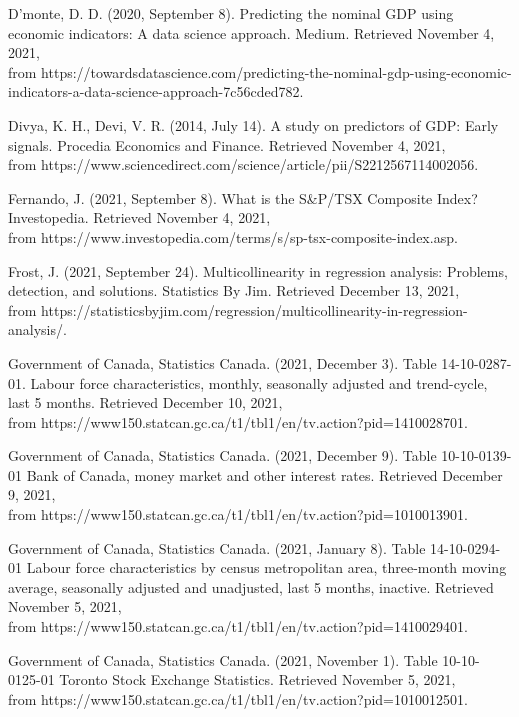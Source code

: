\documentclass{article}
\begin{document}
D’monte, D. D. (2020, September 8). Predicting the nominal GDP using economic indicators: A data science approach. Medium. Retrieved November 4, 2021,\\ from https://towardsdatascience.com/predicting-the-nominal-gdp-using-economic-indicators-a-data-science-approach-7c56cded782. 

Divya, K. H., Devi, V. R. (2014, July 14). A study on predictors of GDP: Early signals. Procedia Economics and Finance. Retrieved November 4, 2021,\\ from https://www.sciencedirect.com/science/article/pii/S2212567114002056. 

Fernando, J. (2021, September 8). What is the S&P/TSX Composite Index? Investopedia. Retrieved November 4, 2021,\\ from https://www.investopedia.com/terms/s/sp-tsx-composite-index.asp. 

Frost, J. (2021, September 24). Multicollinearity in regression analysis: Problems, detection, and solutions. Statistics By Jim. Retrieved December 13, 2021,\\ from https://statisticsbyjim.com/regression/multicollinearity-in-regression-analysis/. 

Government of Canada, Statistics Canada. (2021, December 3). Table 14-10-0287-01. Labour force characteristics, monthly, seasonally adjusted and trend-cycle, last 5 months. Retrieved December 10, 2021,\\ from https://www150.statcan.gc.ca/t1/tbl1/en/tv.action?pid=1410028701.

Government of Canada, Statistics Canada. (2021, December 9). Table 10-10-0139-01 Bank of Canada, money market and other interest rates. Retrieved December 9, 2021,\\ from https://www150.statcan.gc.ca/t1/tbl1/en/tv.action?pid=1010013901.

Government of Canada, Statistics Canada. (2021, January 8). Table 14-10-0294-01 Labour force characteristics by census metropolitan area, three-month moving average, seasonally adjusted and unadjusted, last 5 months, inactive. Retrieved November 5, 2021,\\ from https://www150.statcan.gc.ca/t1/tbl1/en/tv.action?pid=1410029401.

Government of Canada, Statistics Canada. (2021, November 1). Table 10-10-0125-01 Toronto Stock Exchange Statistics. Retrieved November 5, 2021,\\ from https://www150.statcan.gc.ca/t1/tbl1/en/tv.action?pid=1010012501.
\end{document}
